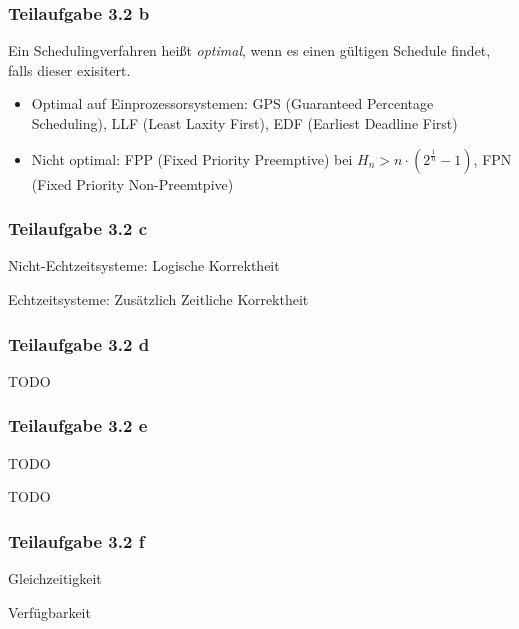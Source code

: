 \documentclass[a4paper]{scrartcl}
\begin{document}
  \subsubsection*{Teilaufgabe 3.2 b}
  Ein Schedulingverfahren heißt \textit{optimal}, wenn es einen gültigen
  Schedule findet, falls dieser exisitert.

  \begin{itemize}
      \item Optimal auf Einprozessorsystemen: GPS (Guaranteed Percentage Scheduling),
            LLF (Least Laxity First),
            EDF (Earliest Deadline First)
      \item Nicht optimal: FPP (Fixed Priority Preemptive) bei $H_n > n \cdot (2^{\frac{1}{n}} - 1)$,
            FPN (Fixed Priority Non-Preemtpive)
  \end{itemize}


  \subsubsection*{Teilaufgabe 3.2 c}
  Nicht-Echtzeitsysteme: Logische Korrektheit

  Echtzeitsysteme: Zusätzlich Zeitliche Korrektheit


  \subsubsection*{Teilaufgabe 3.2 d}
  TODO

  \subsubsection*{Teilaufgabe 3.2 e}
  \begin{enumerate*}[label=(\arabic*)]
      \item TODO
      \item TODO
  \end{enumerate*}

  \subsubsection*{Teilaufgabe 3.2 f}
  \begin{enumerate*}[label=(\arabic*)]
      \item Gleichzeitigkeit
      \item Verfügbarkeit
  \end{enumerate*}

\end{document}
